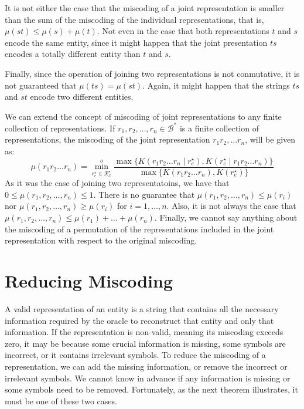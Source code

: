 It is not either the case that the miscoding of a joint representation is smaller than the sum of the miscoding of the individual representations, that is, $\mu( st ) \leq \mu(s) + \mu(t)$. Not even in the case that both representations $t$ and $s$ encode the same entity, since it might happen that the joint presentation $ts$ encodes a totally different entity than $t$ and $s$.

Finally, since the operation of joining two representations is not conmutative, it is not guaranteed that $\mu(ts) = \mu(st)$. Again, it might happen that the strings $ts$ and $st$ encode two different entities.

We can extend the concept of miscoding of joint representations to any finite collection of representations. If $r_1, r_2, \ldots, r_n \in \mathcal{B}^\ast$ is a finite collection of representations, the miscoding of the joint representation $r_1 r_2, \ldots r_n$, will be given as:
\[
\mu(r_1 r_2 \ldots r_n) = \overset{o}{ \underset{ r^\star_e \in \mathcal{R}^\star_\mathcal{E} } \min} \frac{ \max\{ K \left( r_1 r_2 \ldots r_n \mid r^\star_e \right), K \left( r^\star_e \mid r_1 r_2 \ldots r_n \right) \} } { \max\{ K \left( r_1 r_2 \ldots r_n \right), K \left( r^\star_e \right) \} }
\]
As it was the case of joining two representatoins, we have that $0 \leq \mu(r_1, r_2, \ldots, r_n) \leq 1$. There is no guarantee that $\mu(r_1, r_2, \ldots, r_n) \leq \mu(r_i)$ nor $\mu(r_1, r_2, \ldots, r_n) \geq \mu(r_i)$ for $i = 1, \ldots, n$. Also, it is not always the case that $\mu(r_1, r_2, \ldots, r_n) \leq \mu(r_1) + \ldots + \mu(r_n)$. Finally, we cannot say anything about the miscoding of a permutation of the representations included in the joint representation with respect to the original miscoding.

%
%

\section{Reducing Miscoding}

A valid representation of an entity is a string that contains all the necessary information required by the oracle to reconstruct that entity and only that information. If the representation is non-valid, meaning its miscoding exceeds zero, it may be because some crucial information is missing, some symbols are incorrect, or it contains irrelevant symbols. To reduce the miscoding of a representation, we can add the missing information, or remove the incorrect or irrelevant symbols. We cannot know in advance if any information is missing or some symbols need to be removed. Fortunately, as the next theorem illustrates, it must be one of these two cases.

